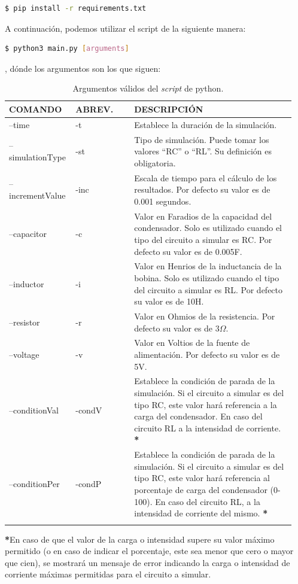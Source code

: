 \documentclass[../main.tex]{subfiles}
\begin{document}
\begin{lstlisting}[language=bash]
  $ pip install -r requirements.txt
\end{lstlisting}

A continuación, podemos utilizar el script de la siguiente manera:

\begin{lstlisting}[language=bash]
  $ python3 main.py [arguments]
\end{lstlisting}

, dónde los argumentos son los que siguen:

\begin{longtable}{|| p{0.2\linewidth} | p{0.2\linewidth} |  p{0.55\linewidth} ||}
  \hline
  
  \textbf{COMANDO} & \textbf{ABREV.} & \textbf{DESCRIPCIÓN} \\ \hline
  --time & -t & Establece la duración de la simulación.  \\ \hline

  --simulationType & -st & Tipo de simulación. Puede tomar los valores ``RC'' o ``RL''. Su definición es obligatoria. \\ \hline

  --incrementValue & -inc & Escala de tiempo para el cálculo de los resultados. Por defecto su valor es de 0.001 segundos. \\ \hline

  --capacitor & -c & Valor en Faradios de la capacidad del condensador. Solo es utilizado cuando el tipo del circuito a simular es RC. Por defecto su valor es de 0.005F. \\ \hline

  --inductor & -i & Valor en Henrios de la inductancia de la bobina. Solo es utilizado cuando el tipo del circuito a simular es RL. Por defecto su valor es de 10H. \\ \hline

  --resistor & -r & Valor en Ohmios de la resistencia. Por defecto su valor es de $3\Omega$. \\ \hline

  --voltage & -v & Valor en Voltios de la fuente de alimentación. Por defecto su valor es de 5V. \\ \hline

  --conditionVal & -condV & Establece la condición de parada de la simulación. Si el circuito a simular es del tipo RC, este valor hará referencia a la carga del condensador. En caso del circuito RL a la intensidad de corriente. \textbf{*} \\ \hline

  --conditionPer & -condP & Establece la condición de parada de la simulación. Si el circuito a simular es del tipo RC, este valor hará referencia al porcentaje de carga del condensador (0-100). En caso del circuito RL, a la intensidad de corriente del mismo. \textbf{*} \\ \hline




    
  \caption{Argumentos válidos del \textit{script} de python.}
  \label{tab::argumentos-script}
  

\end{longtable}

\textbf{*}En caso de que el valor de la carga o intensidad supere su valor máximo permitido (o en caso de indicar el porcentaje, este sea menor que cero o mayor que cien), se mostrará un mensaje de error indicando la carga o intensidad de corriente máximas permitidas para el circuito a simular.
\end{document}
